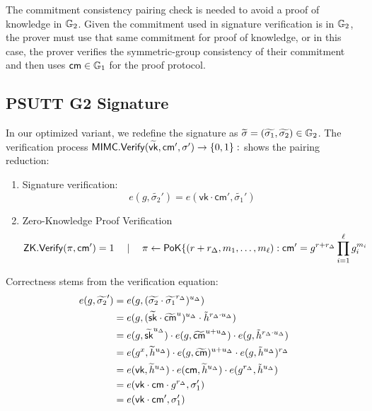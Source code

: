 The commitment consistency pairing check is needed to avoid a proof of knowledge in $\mathbb{G}_2$. Given the commitment used in signature verification is in $\mathbb{G}_2$, the prover must use that same commitment for proof of knowledge, or in this case, the prover verifies the symmetric-group consistency of their commitment and then uses $\mathsf{cm} \in \mathbb{G}_1$ for the proof protocol. 

\subsection{PSUTT  G2 Signature}\label{rerandsig_g2}
\cite{tomescu2022utt}
In our optimized variant, we redefine the signature as $\widetilde{\sigma} = (\widetilde{\sigma_1}, \widetilde{\sigma_2}) \in \mathbb{G}_2$. The verification process $\mathsf{MIMC.Verify}(\widetilde{\mathsf{vk}}, \mathsf{cm}', {\sigma}') \to \{0,1\}:$ shows the pairing reduction:

\begin{enumerate}
    \item Signature verification:
    \[
    e(g, \widetilde{\sigma_2}') = e(\mathsf{vk} \cdot \mathsf{cm}',\widetilde{\sigma_1}')
    \]
    \item Zero-Knowledge Proof Verification
    \[
    \mathsf{ZK.Verify}(\pi, \mathsf{cm}') = 1 \quad \mid \quad \pi \gets \mathsf{PoK}\{(r + r_\Delta, m_1,\ldots,m_\ell): \mathsf{cm}' = g^{r + r_\Delta} \prod_{i=1}^\ell g_i^{m_i}
    \]
\end{enumerate}

Correctness stems from the verification equation:
    \begin{align*}
        e(g, \widetilde{\sigma_2}') &= e(g, (\widetilde{\sigma_2} \cdot \widetilde{\sigma_1}^{r_\Delta})^{u_\Delta}) \\
        &= e(g, (\widetilde{\mathsf{sk}} \cdot \widetilde{\mathsf{cm}}^{u})^{u_\Delta} \cdot \tilde{h}^{r_{\Delta} \cdot u_\Delta}) \\
        &= e(g, \widetilde{\mathsf{sk}}^{u_\Delta}) \cdot e(g, \widetilde{\mathsf{cm}}^{u + u_\Delta}) \cdot e(g,\tilde{h}^{r_{\Delta} \cdot u_\Delta}) \\
        &= e(g^x, \widetilde{h}^{u_\Delta}) \cdot e(g, \widetilde{\mathsf{cm}})^{u + u_\Delta} \cdot e(g,\tilde{h}^{u_\Delta})^{r_{\Delta}} \\
        &= e(\mathsf{vk}, \widetilde{h}^{u_\Delta}) \cdot e(\mathsf{cm}, \widetilde{h}^{u_\Delta}) \cdot e(g^{r_{\Delta}},\tilde{h}^{u_\Delta}) \\
        &= e(\mathsf{vk} \cdot \mathsf{cm} \cdot g^{r_{\Delta}}, \sigma_1')  \\
        &= e(\mathsf{vk} \cdot \mathsf{cm}', \sigma_1')  \\
    \end{align*}


